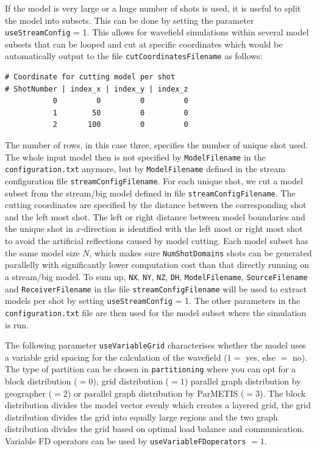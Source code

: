 \documentclass[pdftex,a4paper,parskip,listof=totoc,bibliography=totoc,onehalfspacing,12pt]{scrreprt}
\newcommand{\shellcmd}[1]{\indent\indent\texttt{#1}}	%
\begin{document}
If the model is very large or a huge number of shots is used, it is useful to split the model into subsets. This can be done by setting the parameter \verb+useStreamConfig+ = 1. This allows for wavefield simulations within several model subsets that can be looped and cut at specific coordinates which would be automatically output to the file \verb+cutCoordinatesFilename+ as follows:
\begin{verbatim}
# Coordinate for cutting model per shot 
# ShotNumber | index_x | index_y | index_z
           0         0         0         0
           1        50         0         0
           2       100         0         0
\end{verbatim}
The number of rows, in this case three, specifies the number of unique shot used. The whole input model then is not specified by \verb+ModelFilename+ in the \shellcmd{configuration.txt} anymore, but by \verb+ModelFilename+ defined in the stream configuration file \verb+streamConfigFilename+. For each unique shot, we cut a model subset from the stream/big model defined in file \verb+streamConfigFilename+. The cutting coordinates are specified by the distance between the corresponding shot and the left most shot. The left or right distance between model boundaries and the unique shot in $x$-direction is identified with the left most or right most shot to avoid the artificial reflections caused by model cutting. Each model subset has the same model size $N$, which makes sure \verb+NumShotDomains+ shots can be generated parallelly with significantly lower computation cost than that directly running on a stream/big model. To sum up, \verb+NX+, \verb+NY+, \verb+NZ+, \verb+DH+, \verb+ModelFilename+, \verb+SourceFilename+ and \verb+ReceiverFilename+ in the file \verb+streamConfigFilename+ will be used to extract models per shot by setting \verb+useStreamConfig+ = 1. The other parameters in the \shellcmd{configuration.txt} file are then used for the model subset where the simulation is run. 

The following parameter \verb+useVariableGrid+ characterises whether the model uses a variable grid spacing for the calculation of the wavefield ($1=$ yes, else $=$ no). 
The type of partition can be chosen in \verb+partitioning+ where you can opt for a block distribution ($=0$), grid distribution ($=1$) parallel graph distribution by geographer ($=2$) or parallel graph distribution by ParMETIS ($=3$).
The block distribution divides the model vector evenly which creates a layered grid, the grid distribution divides the grid into equally large regions and the two graph distribution divides the grid based on optimal load balance and communication.
Variable FD operators can be used by \verb+useVariableFDoperators+ $=1$.
\end{document}
